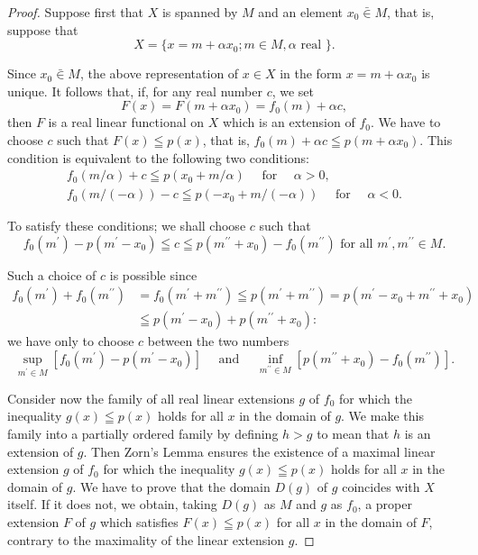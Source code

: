 \begin{proof}
 Suppose first that $X$ is spanned by $M$ and an element $x_0 \bar{\in} M$, that is, suppose that 
\[
X = \{x = m + \alpha x _{0}; m \in M, \alpha \text{ real } \}. \]

Since $x_0 \bar{\in} M$, the above representation of $x \in X$ in the form $x = m + \alpha x_0$ is unique. It follows that, if, for any real number $c$, we set 
\[
F (x) = F (m + \alpha x _{0}) = f _{0} (m) + \alpha c,
\]
then $F$ is a real linear functional on $X$ which is an extension of $f_0$. We have to choose $c$ such that $F(x) \leqq p(x)$, that is, $f_0(m) + \alpha c \leqq p(m + \alpha x_0)$. This condition is equivalent to the following two conditions: 
\[
\begin{gathered}
f _{0} (m / \alpha) + c \leqq p (x _{0} + m / \alpha) \quad \text{ for } \quad \alpha > 0,
\\
f _{0} (m / (- \alpha)) - c \leqq p (- x _{0} + m / (- \alpha)) \quad \text{ for } \quad \alpha < 0.
\end{gathered}
\]

To satisfy these conditions; we shall choose $c$ such that 
\[
f _{0} \left(m ^{\prime}\right) - p \left(m ^{\prime} - x _{0}\right) \leqq c \leqq p \left(m ^{\prime \prime} + x _{0}\right) - f _{0} \left(m ^{\prime \prime}\right) \text{ for all } m ^{\prime}, m ^{\prime \prime} \in M.
\]

Such a choice of $c$ is possible since 
\[
\begin{aligned} f _{0} (m ^{\prime}) + f _{0} (m ^{\prime \prime}) & = f _{0} (m ^{\prime} + m ^{\prime \prime}) \leqq p (m ^{\prime} + m ^{\prime \prime}) = p (m ^{\prime} - x _{0} + m ^{\prime \prime} + x _{0}) \\ & \leqq p (m ^{\prime} - x _{0}) + p (m ^{\prime \prime} + x _{0}): \end{aligned}
\]
we have only to choose $c$ between the two numbers 
\[
\sup\limits _ {m ^{\prime} \in M} [ f _{0} (m ^{\prime}) - p (m ^{\prime} - x _{0}) ] \quad \text{ and } \quad \inf\limits _ {m ^{\prime \prime} \in M} [ p (m ^{\prime \prime} + x _{0}) - f _{0} (m ^{\prime \prime}) ].
\]

Consider now the family of all real linear extensions $g$ of $f_0$ for which the inequality $g(x) \leqq p(x)$ holds for all $x$ in the domain of $g$. We make this family into a partially ordered family by defining $h > g$ to mean that $h$ is an extension of $g$. Then Zorn's Lemma ensures the existence of a maximal linear extension $g$ of $f_0$ for which the inequality $g(x) \leqq p(x)$ holds for all $x$ in the domain of $g$. We have to prove that the domain $D(g)$ of $g$ coincides with $X$ itself. If it does not, we obtain, taking $D(g)$ as $M$ and $g$ as $f_0$, a proper extension $F$ of $g$ which satisfies $F(x) \leqq p(x)$ for all $x$ in the domain of $F$, contrary to the maximality of the linear extension $g$. 
\end{proof}

